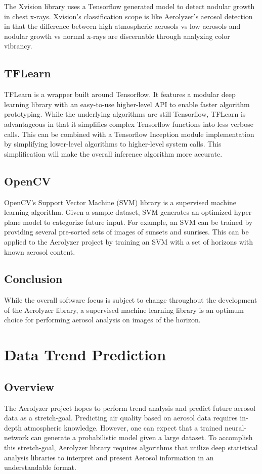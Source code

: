 \documentclass[onecolumn, draftclsnofoot,10pt, compsoc]{IEEEtran}
\begin{document}
\begin{singlespace}
		
		The Xvision library uses a Tensorflow generated model to detect nodular growth in chest x-rays.
		Xvision’s classification scope is like Aerolyzer’s aerosol detection in that the difference between high atmospheric aerosols vs low aerosols and nodular growth vs normal x-rays are discernable through analyzing color vibrancy. \cite{xvision}

	\subsection{TFLearn}
		TFLearn is a wrapper built around Tensorflow.
		It features a modular deep learning library with an easy-to-use higher-level API to enable faster algorithm prototyping.
		While the underlying algorithms are still Tensorflow, TFLearn is advantageous in that it simplifies complex Tensorflow functions into less verbose calls.
		This can be combined with a Tensorflow Inception module implementation by simplifying lower-level algorithms to higher-level system calls.
		This simplification will make the overall inference algorithm more accurate. \cite{TFLearn}

	\subsection{OpenCV}
		OpenCV's Support Vector Machine (SVM) library is a supervised machine learning algorithm.
		Given a sample dataset, SVM generates an optimized hyper-plane model to categorize future input.
		For example, an SVM can be trained by providing several pre-sorted sets of images of sunsets and sunrises.
		This can be applied to the Aerolyzer project by training an SVM with a set of horizons with known aerosol content. \cite{svm}

	\subsection{Conclusion}
		While the overall software focus is subject to change throughout the development of the Aerolyzer library, a supervised machine learning library is an optimum choice for performing aerosol analysis on images of the horizon.

\section{Data Trend Prediction}
	\subsection{Overview}
		The Aerolyzer project hopes to perform trend analysis and predict future aerosol data as a stretch-goal.
		Predicting air quality based on aerosol data requires in-depth atmospheric knowledge.
		However, one can expect that a trained neural-network can generate a probabilistic model given a large dataset.
		To accomplish this stretch-goal, Aerolyzer library requires algorithms that utilize deep statistical analysis libraries to interpret and present Aerosol information in an understandable format.


\end{singlespace}
\end{document}
